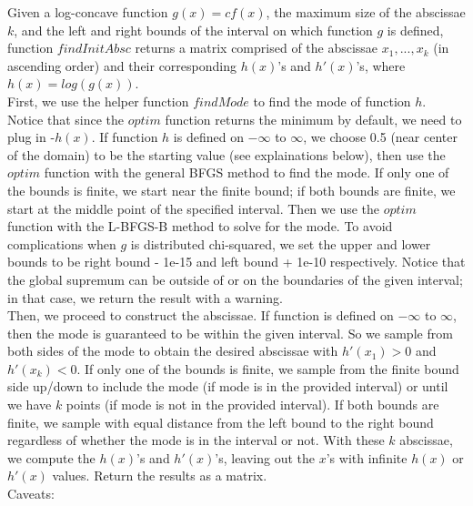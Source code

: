 \documentclass{article}\usepackage[]{graphicx}\usepackage[]{color}
\begin{document}
Given a log-concave function $g(x)=cf(x)$, the maximum size of the abscissae $k$, and the left and right bounds of the interval on which function $g$ is defined, function $findInitAbsc$ returns a matrix comprised of the abscissae $x_1,...,x_k$ (in ascending order) and their corresponding $h(x)$'s and $h'(x)$'s, where $h(x)=log(g(x))$. 
\\[12pt]
First, we use the helper function $findMode$ to find the mode of function $h$. Notice that since the $optim$ function returns the minimum by default, we need to plug in -$h(x)$. If function $h$ is defined on $-\infty$ to $\infty$, we choose 0.5 (near center of the domain) to be the starting value (see explainations below), then use the $optim$ function with the general BFGS method to find the mode. If only one of the bounds is finite, we start near the finite bound; if both bounds are finite, we start at the middle point of the specified interval. Then we use the $optim$ function with the L-BFGS-B method to solve for the mode. To avoid complications when $g$ is distributed chi-squared, we set the upper and lower bounds to be right bound - 1e-15 and left bound + 1e-10 respectively. Notice that the global supremum can be outside of or on the boundaries of the given interval; in that case, we return the result with a warning. 
\\[12pt]
Then, we proceed to construct the abscissae. If function is defined on $-\infty$ to $\infty$, then the mode is guaranteed to be within the given interval. So we sample from both sides of the mode to obtain the desired abscissae with $h'(x_1)>0$ and $h'(x_k)<0$. If only one of the bounds is finite, we sample from the finite bound side up/down to include the mode (if mode is in the provided interval) or until we have $k$ points (if mode is not in the provided interval). If both bounds are finite, we sample with equal distance from the left bound to the right bound regardless of whether the mode is in the interval or not. With these $k$ abscissae, we compute the $h(x)$'s and $h'(x)$'s, leaving out the $x$'s with infinite $h(x)$ or $h'(x)$ values. Return the results as a matrix.
\\[12pt]
Caveats:
\end{document}
